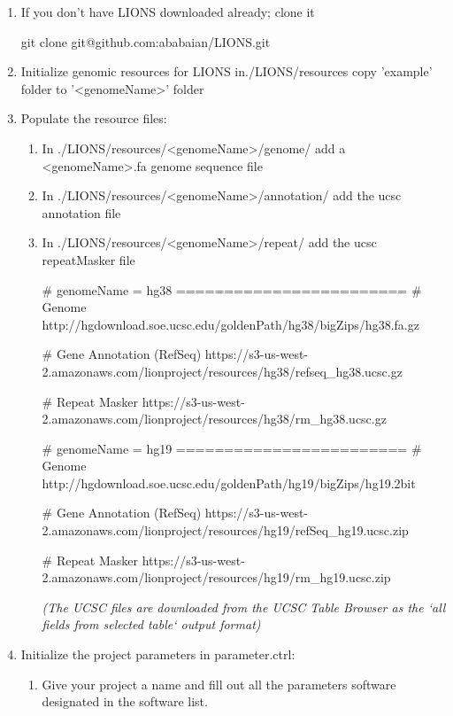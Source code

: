 \documentclass[11pt]{scrartcl}
\newcommand{\arrows}[1]{\textless #1\textgreater}
\begin{document}
\begin{enumerate}
\item If you don't have LIONS downloaded already; clone it
\begin{bash}
git clone git@github.com:ababaian/LIONS.git
\end{bash}

\item Initialize genomic resources for LIONS in./LIONS/resources copy 'example' folder to '\arrows{genomeName}' folder

\item Populate the resource files:
\begin{enumerate}
\item In ./LIONS/resources/\arrows{genomeName}/genome/ add a \arrows{genomeName}.fa genome sequence file
\item In ./LIONS/resources/\arrows{genomeName}/annotation/ add the ucsc annotation file
\item In ./LIONS/resources/\arrows{genomeName}/repeat/ add the ucsc repeatMasker file

\begin{bash}
# genomeName = hg38 ========================
# Genome
http://hgdownload.soe.ucsc.edu/goldenPath/hg38/bigZips/hg38.fa.gz

# Gene Annotation (RefSeq)
https://s3-us-west-2.amazonaws.com/lionproject/resources/hg38/refseq_hg38.ucsc.gz

# Repeat Masker
https://s3-us-west-2.amazonaws.com/lionproject/resources/hg38/rm_hg38.ucsc.gz
	
# genomeName = hg19 ========================
# Genome
http://hgdownload.soe.ucsc.edu/goldenPath/hg19/bigZips/hg19.2bit

# Gene Annotation (RefSeq)
https://s3-us-west-2.amazonaws.com/lionproject/resources/hg19/refSeq_hg19.ucsc.zip

# Repeat Masker
https://s3-us-west-2.amazonaws.com/lionproject/resources/hg19/rm_hg19.ucsc.zip	
	
\end{bash}

\textit{(The UCSC files are downloaded from the UCSC Table Browser as the `all fields from selected table` output format)}
\end{enumerate}


\item Initialize the project parameters in parameter.ctrl:
\begin{enumerate}
\item Give your project a name and fill out all the parameters
 software designated in the software list.
\end{enumerate}



\end{enumerate}
\end{document}
